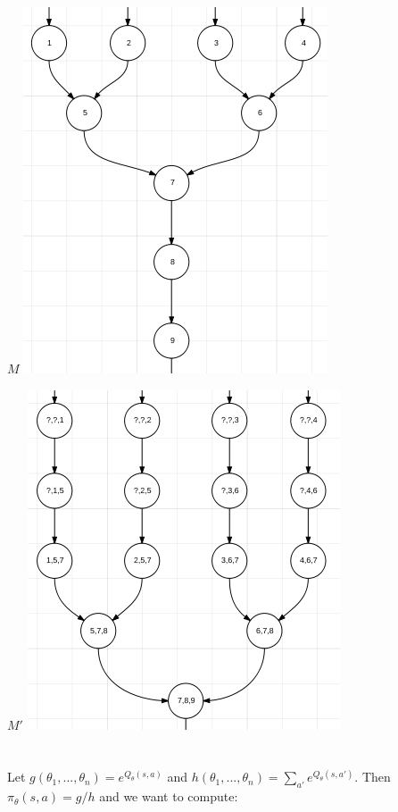 \documentclass{article}
\begin{document}
\newpage

\begin{center}

$M$
\includegraphics[scale=0.85]{M.png}

\vspace{5em}

$M'$
\includegraphics[scale=0.85]{M_prime.png}

\end{center}


\section{}
Let $g(\theta_1,...,\theta_n) = e^{Q_{\theta}(s,a)}$ and $h(\theta_1,...,
\theta_n) = \sum_{a'} e^{Q_{\theta}(s,a')}$. Then $\pi_{\theta}(s,a) = g/h$
and we want to compute:
\end{document}
